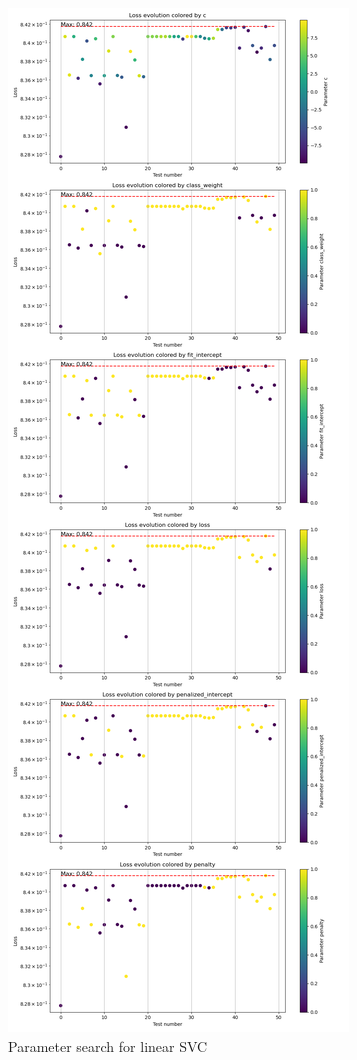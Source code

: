 \documentclass{article}
\begin{document}
\begin{figure}
    \centering
    \includegraphics{report_img/param_search/linear_svc}
    \caption{Parameter search for linear SVC}
    \label{fig:}
\end{figure}
\end{document}
